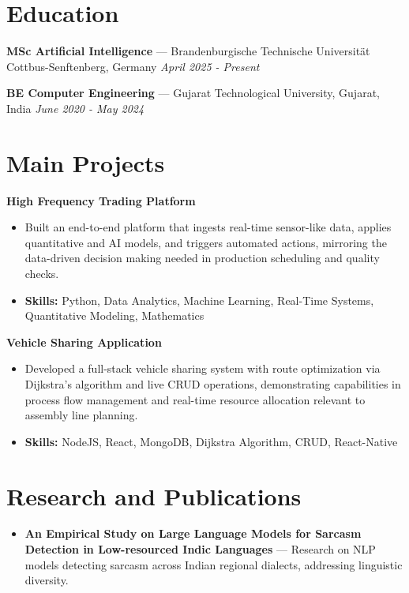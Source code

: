 \documentclass[a4paper,10pt]{article}
\begin{document}
\section*{Education}
\textbf{MSc Artificial Intelligence} — Brandenburgische Technische Universität Cottbus-Senftenberg, Germany \hfill \textit{April 2025 - Present}\par
\vspace{1.5pt}
\textbf{BE Computer Engineering} — Gujarat Technological University, Gujarat, India \hfill \textit{June 2020 - May 2024}\par

\section*{Main Projects}
\textbf{High Frequency Trading Platform}\par
\vspace{1pt}
\begin{itemize}
  \item Built an end-to-end platform that ingests real-time sensor-like data, applies quantitative and AI models, and triggers automated actions, mirroring the data-driven decision making needed in production scheduling and quality checks.
  \item \textbf{Skills:} Python, Data Analytics, Machine Learning, Real-Time Systems, Quantitative Modeling, Mathematics
\end{itemize}
\vspace{3pt}
\textbf{Vehicle Sharing Application}\par
\vspace{1pt}
\begin{itemize}
  \item Developed a full-stack vehicle sharing system with route optimization via Dijkstra's algorithm and live CRUD operations, demonstrating capabilities in process flow management and real-time resource allocation relevant to assembly line planning.
  \item \textbf{Skills:} NodeJS, React, MongoDB, Dijkstra Algorithm, CRUD, React-Native
\end{itemize}

\section*{Research and Publications}
\begin{itemize}
\item \textbf{An Empirical Study on Large Language Models for Sarcasm Detection in Low-resourced Indic Languages} — Research on NLP models detecting sarcasm across Indian regional dialects, addressing linguistic diversity.
\end{itemize}
\end{document}
